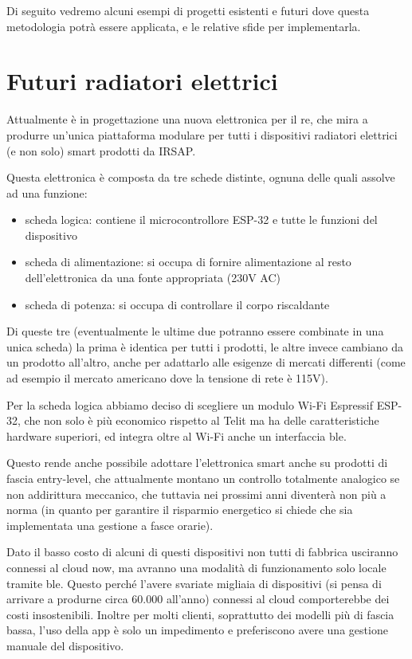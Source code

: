 \documentclass[12pt,a4paper,twoside,titlepage]{book}
\begin{document}
Di seguito vedremo alcuni esempi di progetti esistenti e futuri dove questa metodologia
potrà essere applicata, e le relative sfide per implementarla.

\section{Futuri radiatori elettrici}

Attualmente è in progettazione una nuova elettronica per il \Gls{re},
che mira a produrre un'unica piattaforma modulare per tutti i dispositivi radiatori elettrici
(e non solo) smart prodotti da IRSAP.

Questa elettronica è composta da tre schede distinte, ognuna delle quali assolve
ad una funzione:
\begin{itemize}
    \item scheda logica: contiene il microcontrollore ESP-32 e tutte le funzioni del dispositivo
    \item scheda di alimentazione: si occupa di fornire alimentazione al resto dell'elettronica
        da una fonte appropriata (230V AC)
    \item scheda di potenza: si occupa di controllare il corpo riscaldante
\end{itemize}

Di queste tre (eventualmente le ultime due potranno essere combinate in una
unica scheda) la prima è identica per tutti i prodotti, le altre invece cambiano
da un prodotto all'altro, anche per adattarlo alle esigenze di mercati differenti
(come ad esempio il mercato americano dove la tensione di rete è 115V).

Per la scheda logica abbiamo deciso di scegliere un modulo Wi-Fi Espressif
ESP-32, che non solo è più economico rispetto al Telit ma ha delle caratteristiche
hardware superiori, ed integra oltre al Wi-Fi anche un interfaccia \Gls{ble}.

Questo rende anche possibile adottare l'elettronica smart anche su prodotti di
fascia entry-level, che attualmente montano un controllo totalmente analogico se non
addirittura meccanico, che tuttavia nei prossimi anni diventerà non più a norma (in
quanto per garantire il risparmio energetico si chiede che sia implementata una gestione
a fasce orarie).

Dato il basso costo di alcuni di questi dispositivi non tutti di fabbrica usciranno
connessi al cloud \Gls{now}, ma avranno una modalità di funzionamento solo locale
tramite \Gls{ble}. Questo perché l'avere svariate migliaia di dispositivi
(si pensa di arrivare a produrne circa 60.000 all'anno) connessi al cloud comporterebbe
dei costi insostenibili. Inoltre per molti clienti, soprattutto dei modelli più di
fascia bassa, l'uso della app è solo un impedimento e preferiscono avere una gestione
manuale del dispositivo.
\end{document}
